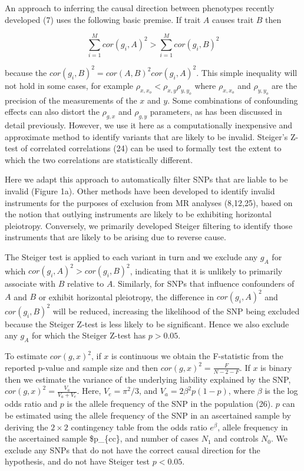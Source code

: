 \documentclass[]{article}
\begin{document}
An approach to inferring the causal direction between phenotypes
recently developed (7) uses the following basic premise. If trait \(A\)
causes trait \(B\) then

\[
\sum^M_{i=1}{cor(g_{i}, A)^2} > \sum^M_{i=1}{cor(g_{i}, B)^2}
\]

because the \(cor(g_{i}, B)^2 = cor(A, B)^{2} cor(g_{i}, A)^{2}\). This
simple inequality will not hold in some cases, for example
\(\rho_{x, x_o} < \rho_{x,y}\rho_{y,y_o}\) where \(\rho_{x, x_o}\) and
\(\rho_{y, y_o}\) are the precision of the measurements of the \(x\) and
\(y\). Some combinations of confounding effects can also distort the
\(\rho_{g,x}\) and \(\rho_{g,y}\) parameters, as has been discussed in
detail previously. However, we use it here as a computationally
inexpensive and approximate method to identify variants that are likely
to be invalid. Steiger's Z-test of correlated correlations (24) can be
used to formally test the extent to which the two correlations are
statistically different.

Here we adapt this approach to automatically filter SNPs that are liable
to be invalid (Figure 1a). Other methods have been developed to identify
invalid instruments for the purposes of exclusion from MR analyses
(8,12,25), based on the notion that outlying instruments are likely to
be exhibiting horizontal pleiotropy. Conversely, we primarily developed
Steiger filtering to identify those instruments that are likely to be
arising due to reverse cause.

The Steiger test is applied to each variant in turn and we exclude any
\(g_{A}\) for which \(cor(g_{i}, A)^2 > cor(g_{i}, B)^2\), indicating
that it is unlikely to primarily associate with \(B\) relative to \(A\).
Similarly, for SNPs that influence confounders of \(A\) and \(B\) or
exhibit horizontal pleiotropy, the difference in \(cor(g_{i}, A)^2\) and
\(cor(g_{i}, B)^2\) will be reduced, increasing the likelihood of the
SNP being excluded because the Steiger Z-test is less likely to be
significant. Hence we also exclude any \(g_{A}\) for which the Steiger
Z-test has \(p > 0.05\).

To estimate \(cor(g, x)^2\), if \(x\) is continuous we obtain the
F-statistic from the reported p-value and sample size and then
\(cor(g, x)^2 = \frac{F}{N - 2 - F}\). If \(x\) is binary then we
estimate the variance of the underlying liability explained by the SNP,
\(cor(g, x)^2 = \frac{V_a}{V_a + V_e}\). Here, \(V_e = \pi^2/3\), and
\(V_a = 2\beta^2p(1-p)\), where \(\beta\) is the log odds ratio and
\(p\) is the allele frequency of the SNP in the population (26). \(p\)
can be estimated using the allele frequency of the SNP in an ascertained
sample by deriving the \(2 \times 2\) contingency table from the odds
ratio \(e^\beta\), allele frequency in the ascertained sample
\$p\_\{cc\}, and number of cases \(N_1\) and controls \(N_0\). We
exclude any SNPs that do not have the correct causal direction for the
hypothesis, and do not have Steiger test \(p < 0.05\).
\end{document}

